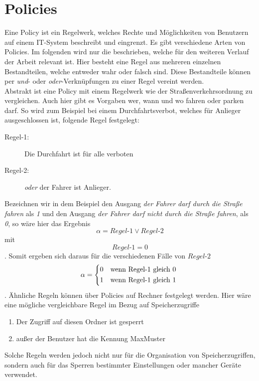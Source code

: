 \chapter{Policies} \label{Policies}
Eine Policy ist ein Regelwerk, welches Rechte und Möglichkeiten von Benutzern auf einem IT-System beschreibt und eingrenzt. Es gibt verschiedene Arten von Policies. Im folgenden wird nur die beschrieben, welche für den weiteren Verlauf der Arbeit relevant ist. Hier besteht eine Regel aus mehreren einzelnen Bestandteilen, welche entweder wahr oder falsch sind. Diese Bestandteile können per \textit{und}- oder \textit{oder}-Verknüpfungen zu einer Regel vereint werden.\\
Abstrakt ist eine Policy mit einem Regelwerk wie der Straßenverkehrsordnung zu vergleichen. Auch hier gibt es Vorgaben wer, wann und wo fahren oder parken darf. So wird zum Beispiel bei einem Durchfahrtsverbot, welches für Anlieger ausgeschlossen ist, folgende Regel festgelegt:
\begin{description}
	\item[Regel-1: ] Die Durchfahrt ist für alle verboten
	\item[Regel-2: ] \textit{oder} der Fahrer ist Anlieger.
\end{description}
Bezeichnen wir in dem Beispiel den Ausgang \textit{der Fahrer darf durch die Straße fahren} als \textit{1} und den Ausgang \textit{der Fahrer darf nicht durch die Straße fahren}, als \textit{0}, so wäre hier das Ergebnis
\begin{equation*}
	\alpha = Regel\text{-}1 \vee Regel\text{-}2
\end{equation*} mit 
\begin{equation*}
	Regel\text{-}1=0
\end{equation*}. Somit ergeben sich daraus für die verschiedenen Fälle von $Regel$-$2$
\[
	\alpha = 
		\begin{dcases*}
			0 & wenn Regel\text{-}1 gleich 0\\
			1 & wenn Regel\text{-}1 gleich 1
		\end{dcases*}
\]
. Ähnliche Regeln können über Policies auf Rechner festgelegt werden. Hier wäre eine mögliche vergleichbare Regel im Bezug auf Speicherzugriffe
\begin{enumerate}
	\item Der Zugriff auf diesen Ordner ist gesperrt
	\item außer der Benutzer hat die Kennung MaxMuster
\end{enumerate}
Solche Regeln werden jedoch nicht nur für die Organisation von Speicherzugriffen, sondern auch für das Sperren bestimmter Einstellungen oder mancher Geräte verwendet.